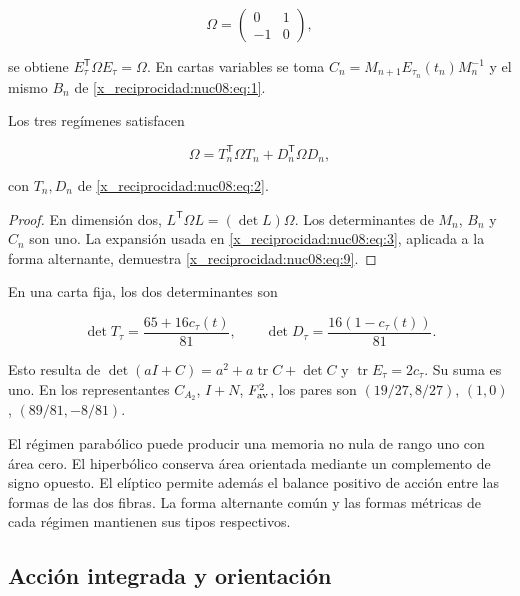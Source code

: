 \[
\Omega=\begin{pmatrix}0&1\\-1&0\end{pmatrix},
\]

se obtiene \(E_\tau^\mathsf T\Omega E_\tau=\Omega\). En cartas variables se toma
\(C_n=M_{n+1}E_{\tau_n}(t_n)M_n^{-1}\) y el mismo \(B_n\) de \eqref{x_reciprocidad:nuc08:eq:1}.

\begin{theorem}
Los tres regímenes satisfacen

\begin{equation}
\boxed{\Omega=T_n^\mathsf T\Omega T_n+D_n^\mathsf T\Omega D_n,}
\label{x_reciprocidad:nuc08:eq:9}
\end{equation}

con \(T_n,D_n\) de \eqref{x_reciprocidad:nuc08:eq:2}.
\end{theorem}

\begin{proof}
En dimensión dos, \(L^\mathsf T\Omega L=(\det L)\Omega\). Los determinantes de \(M_n\), \(B_n\) y \(C_n\) son uno. La expansión usada en \eqref{x_reciprocidad:nuc08:eq:3}, aplicada a la forma alternante, demuestra \eqref{x_reciprocidad:nuc08:eq:9}.
\end{proof}

En una carta fija, los dos determinantes son

\begin{equation}
\det T_\tau=\frac{65+16c_\tau(t)}{81},\qquad
\det D_\tau=\frac{16(1-c_\tau(t))}{81}.
\label{x_reciprocidad:nuc08:eq:10}
\end{equation}

Esto resulta de \(\det(aI+C)=a^2+a\operatorname{tr}C+\det C\) y \(\operatorname{tr}E_\tau=2c_\tau\). Su suma es uno. En los representantes \(C_{A_2}\), \(I+N\), \(F_{\rm av}^2\), los pares son \((19/27,8/27)\), \((1,0)\), \((89/81,-8/81)\).

El régimen parabólico puede producir una memoria no nula de rango uno con área cero. El hiperbólico conserva área orientada mediante un complemento de signo opuesto. El elíptico permite además el balance positivo de acción entre las formas de las dos fibras. La forma alternante común y las formas métricas de cada régimen mantienen sus tipos respectivos.

\subsection{Acción integrada y orientación}

